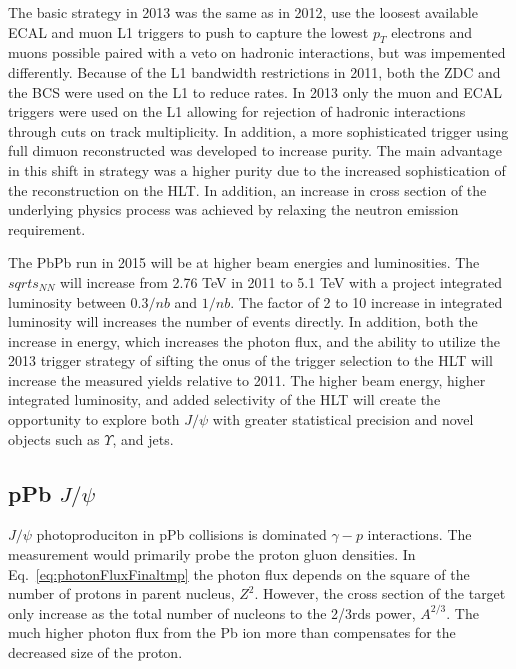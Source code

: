     The basic strategy in 2013 was the same as in 2012, use the loosest 
      available ECAL and muon L1 triggers to push to capture the lowest $p_{T}$
      electrons and muons possible paired with a veto on hadronic interactions,
      but was impemented differently.
    Because of the L1 bandwidth restrictions in 2011, both the ZDC and the BCS 
      were used on the L1 to reduce rates.
    In 2013 only the muon and ECAL triggers were used on the L1 allowing for 
      rejection of hadronic interactions through cuts on track multiplicity. 
    In addition, a more sophisticated trigger using full dimuon reconstructed 
      was developed to increase purity.
    The main advantage in this shift in strategy was a higher purity due to 
      the increased sophistication of the reconstruction on the HLT.
    In addition, an increase in cross section of the underlying physics process
      was achieved by relaxing the neutron emission requirement.

    The PbPb run in 2015 will be at higher beam energies and luminosities.
    The $sqrt{s_{NN}}$ will increase from 2.76 TeV in 2011 to 5.1 TeV with
      a project integrated luminosity between $0.3/nb$ and $1/nb$. 
    The factor of 2 to 10 increase in integrated luminosity will increases the 
      number of events directly.
    In addition, both the increase in energy, which increases the photon flux,
      and the ability to utilize the 2013 trigger strategy of sifting the 
      onus of the trigger selection to the HLT will increase the measured 
      yields relative to 2011.
    The higher beam energy, higher integrated luminosity, and added selectivity
      of the HLT will create the opportunity to explore both $J/\psi$ with 
      greater statistical precision and novel objects such as $\Upsilon$, and 
      jets. 

    \subsection{pPb $J/\psi$}
      $J/\psi$ photoproduciton in pPb collisions is dominated $\gamma-p$ 
        interactions.
      The measurement would primarily probe the proton gluon densities.
      In Eq.~\ref{eq:photonFluxFinaltmp} the photon flux depends on the square
      of the number of protons in parent nucleus, $Z^{2}$. 
      However, the cross section of the target only increase as the total 
        number of nucleons to the 2/3rds power, $A^{2/3}$.
      The much higher photon flux from the Pb ion more than compensates for 
        the decreased size of the proton.

